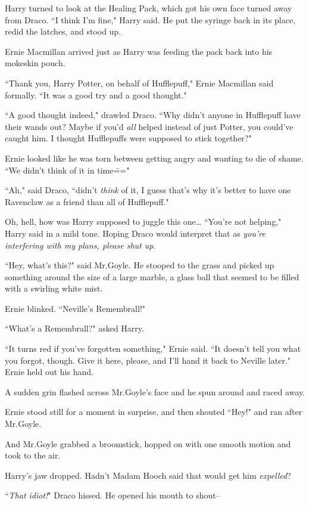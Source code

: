 Harry turned to look at the Healing Pack, which got his own face turned away from Draco. ``I think I'm fine," Harry said. He put the syringe back in its place, redid the latches, and stood up.

Ernie Macmillan arrived just as Harry was feeding the pack back into his mokeskin pouch.

``Thank you, Harry Potter, on behalf of Hufflepuff," Ernie Macmillan said formally. ``It was a good try and a good thought."

``A good thought indeed," drawled Draco. ``Why didn't anyone in Hufflepuff have their wands out? Maybe if you'd \emph{all} helped instead of just Potter, you could've caught him. I thought Hufflepuffs were supposed to stick together?"

Ernie looked like he was torn between getting angry and wanting to die of shame. ``We didn't think of it in time\==="

``Ah," said Draco, ``didn't \emph{think} of it, I guess that's why it's better to have one Ravenclaw as a friend than all of Hufflepuff."

Oh, hell, how was Harry supposed to juggle this one{\ldots} ``You're not helping," Harry said in a mild tone. Hoping Draco would interpret that as \emph{you're interfering with my plans, please shut up}.

``Hey, what's this?" said Mr.\?Goyle. He stooped to the grass and picked up something around the size of a large marble, a glass ball that seemed to be filled with a swirling white mist.

Ernie blinked. ``Neville's Remembrall!"

``What's a Remembrall?" asked Harry.

``It turns red if you've forgotten something," Ernie said. ``It doesn't tell you what you forgot, though. Give it here, please, and I'll hand it back to Neville later." Ernie held out his hand.

A sudden grin flashed across Mr.\?Goyle's face and he spun around and raced away.

Ernie stood still for a moment in surprise, and then shouted ``Hey!" and ran after Mr.\?Goyle.

And Mr.\?Goyle grabbed a broomstick, hopped on with one smooth motion and took to the air.

Harry's jaw dropped. Hadn't Madam Hooch said that would get him \emph{expelled}?

``\emph{That idiot!}" Draco hissed. He opened his mouth to shout\---

